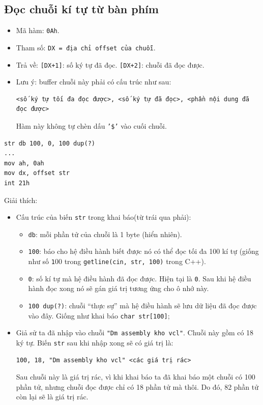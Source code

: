 \documentclass[12pt]{report}
\newcommand{\code}[1]{\texttt{#1}}
\begin{document}
\subsection{Đọc chuỗi kí tự từ bàn phím}
\begin{itemize}
    \item Mã hàm: \code{0Ah}.
    \item Tham số: \code{DX = địa chỉ offset của chuỗi}.
    \item Trả về: \code{[DX+1]}: số ký tự đã đọc. \code{[DX+2]}: chuỗi đã đọc được.
    \item Lưu ý: buffer chuỗi này phải có cấu trúc như sau:
    \begin{verbatim}
<số ký tự tối đa đọc được>, <số ký tự đã đọc>, <phần nội dung đã đọc được>
    \end{verbatim}
    \par Hàm này không tự chèn dấu \code{'\$'} vào cuối chuỗi.
\end{itemize}
\begin{verbatim}
str db 100, 0, 100 dup(?)
...
mov ah, 0ah 
mov dx, offset str 
int 21h
\end{verbatim}
Giải thích:
\begin{itemize}
    \item Cấu trúc của biến \code{str} trong khai báo(từ trái qua phải):
    \begin{itemize}
        \item \code{db}: mỗi phần tử của chuỗi là 1 byte (hiển nhiên).
        \item \code{100}: báo cho hệ điều hành biết được nó có thể đọc tối đa 100 kí tự (giống như số \code 100 trong \code{getline(cin, str, 100)} trong C++).
        \item \code{0}: số kí tự mà hệ điều hành đã đọc được. Hiện tại là \code 0. Sau khi hệ điều hành đọc xong nó sẽ gán giá trị tương ứng cho ô nhớ này.
        \item \code{100 dup(?)}: chuỗi ``thực sự'' mà hệ điều hành sẽ lưu dữ liệu đã đọc được vào đây. Giống như khai báo \code{char str[100]};
    \end{itemize}
    \item Giả sử ta đã nhập vào chuỗi \code{"Dm assembly kho vcl"}. Chuỗi này gồm có 18 ký tự. Biến \code{str} sau khi nhập xong sẽ có giá trị là:
    \begin{verbatim}
100, 18, "Dm assembly kho vcl" <các giá trị rác>
    \end{verbatim} 
    \par Sau chuỗi này là giá trị rác, vì khi khai báo ta đã khai báo một chuỗi có 100 phần tử, nhưng chuỗi đọc được chỉ có 18 phần tử mà thôi. Do đó, 82 phần tử còn lại sẽ là giá trị rác.
\end{itemize}
\end{document}
